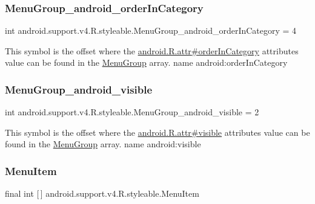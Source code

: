 \subsubsection{\texorpdfstring{Menu\+Group\+\_\+android\+\_\+order\+In\+Category}{MenuGroup\_android\_orderInCategory}}
{\footnotesize\ttfamily int android.\+support.\+v4.\+R.\+styleable.\+Menu\+Group\+\_\+android\+\_\+order\+In\+Category = 4\hspace{0.3cm}{\ttfamily [static]}}

This symbol is the offset where the \hyperlink{}{android.\+R.\+attr\#order\+In\+Category} attribute\textquotesingle{}s value can be found in the \hyperlink{classandroid_1_1support_1_1v4_1_1R_1_1styleable_a83610c6b8679a40b3508815b6fd56980}{Menu\+Group} array.  name android\+:order\+In\+Category \mbox{\label{classandroid_1_1support_1_1v4_1_1R_1_1styleable_ac3db0cd59a9a1fe7f84c406651350dbe}} 
\subsubsection{\texorpdfstring{Menu\+Group\+\_\+android\+\_\+visible}{MenuGroup\_android\_visible}}
{\footnotesize\ttfamily int android.\+support.\+v4.\+R.\+styleable.\+Menu\+Group\+\_\+android\+\_\+visible = 2\hspace{0.3cm}{\ttfamily [static]}}

This symbol is the offset where the \hyperlink{}{android.\+R.\+attr\#visible} attribute\textquotesingle{}s value can be found in the \hyperlink{classandroid_1_1support_1_1v4_1_1R_1_1styleable_a83610c6b8679a40b3508815b6fd56980}{Menu\+Group} array.  name android\+:visible \mbox{\label{classandroid_1_1support_1_1v4_1_1R_1_1styleable_a4234e016636b99c0c3d9cfc512903697}} 
\subsubsection{\texorpdfstring{Menu\+Item}{MenuItem}}
{\footnotesize\ttfamily final int \mbox{[}$\,$\mbox{]} android.\+support.\+v4.\+R.\+styleable.\+Menu\+Item\hspace{0.3cm}{\ttfamily [static]}}

